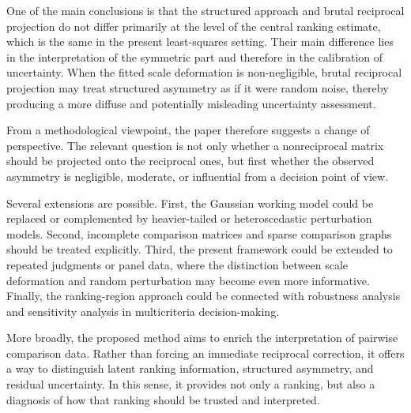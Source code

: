 \documentclass[11pt]{amsart}
\theoremstyle{definition}
\theoremstyle{plain}
\numberwithin{equation}{section}
\begin{document}
One of the main conclusions is that the structured approach and brutal reciprocal projection do not differ primarily at the level of the central ranking estimate, which is the same in the present least-squares setting. Their main difference lies in the interpretation of the symmetric part and therefore in the calibration of uncertainty. When the fitted scale deformation is non-negligible, brutal reciprocal projection may treat structured asymmetry as if it were random noise, thereby producing a more diffuse and potentially misleading uncertainty assessment.

From a methodological viewpoint, the paper therefore suggests a change of perspective. The relevant question is not only whether a nonreciprocal matrix should be projected onto the reciprocal ones, but first whether the observed asymmetry is negligible, moderate, or influential from a decision point of view.

Several extensions are possible. First, the Gaussian working model could be replaced or complemented by heavier-tailed or heteroscedastic perturbation models. Second, incomplete comparison matrices and sparse comparison graphs should be treated explicitly. Third, the present framework could be extended to repeated judgments or panel data, where the distinction between scale deformation and random perturbation may become even more informative. Finally, the ranking-region approach could be connected with robustness analysis and sensitivity analysis in multicriteria decision-making.

More broadly, the proposed method aims to enrich the interpretation of pairwise comparison data. Rather than forcing an immediate reciprocal correction, it offers a way to distinguish latent ranking information, structured asymmetry, and residual uncertainty. In this sense, it provides not only a ranking, but also a diagnosis of how that ranking should be trusted and interpreted.




\end{document}
